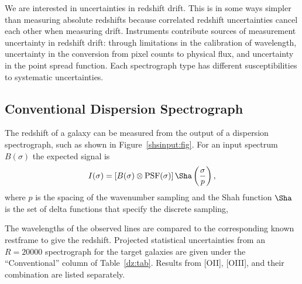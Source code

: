 \documentclass[preprint2, 10pt]{aastex}
\begin{document}
We are interested in uncertainties in redshift drift.  This is in some ways simpler than measuring absolute redshifts
because correlated redshift uncertainties cancel each other when measuring drift.
Instruments contribute sources of measurement uncertainty in redshift drift:  through limitations in the calibration
of wavelength,  uncertainty in the conversion from pixel counts to physical flux, and uncertainty in the point spread function.
Each spectrograph type
has different susceptibilities to  systematic uncertainties.


\subsection{Conventional Dispersion Spectrograph} 
The redshift of a galaxy can be measured from the output of a dispersion spectrograph, such as shown in Figure~\ref{shsinput:fig}.
For an input spectrum $B(\sigma)$ the expected signal is
\begin{equation}
I(\sigma) = \left[B(\sigma)\otimes \mbox{PSF}(\sigma)\right]\Sha\left(\frac{\sigma}{p}\right),
\label{conventional:eqn}
\end{equation}
where $p$ is the spacing of the wavenumber sampling and the Shah function $\Sha$ is the set of delta functions
that specify the discrete sampling,

The wavelengths of the observed lines are compared to the corresponding known restframe to give
the redshift.
Projected statistical uncertainties from an $R=20000$ spectrograph for the target galaxies are given under
the ``Conventional'' column of Table~\ref{dz:tab}.  Results from [OII], [OIII], and their combination are listed separately.
\end{document}
